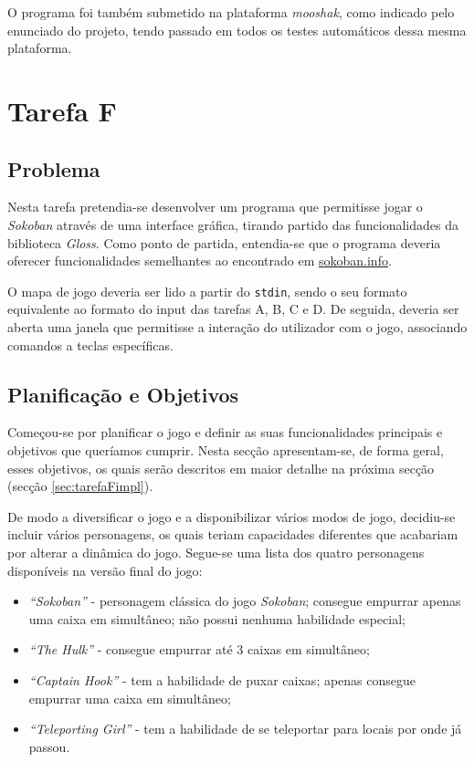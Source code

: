 \documentclass[a4paper]{article}
\begin{document}
O programa foi também submetido na plataforma \textit{mooshak}, como indicado pelo enunciado do projeto, tendo passado em todos os testes automáticos dessa mesma plataforma.

\section{Tarefa F}

\subsection{Problema}

Nesta tarefa pretendia-se desenvolver um programa que permitisse jogar o \textit{Sokoban} através de uma interface gráfica, tirando partido das funcionalidades da biblioteca \textit{Gloss}. Como ponto de partida, entendia-se que o programa deveria oferecer funcionalidades semelhantes ao encontrado em \url{sokoban.info}.

O mapa de jogo deveria ser lido a partir do \texttt{stdin}, sendo o seu formato equivalente ao formato do input das tarefas A, B, C e D. De seguida, deveria ser aberta uma janela que permitisse a interação do utilizador com o jogo, associando comandos a teclas específicas.

\subsection{Planificação e Objetivos}

Começou-se por planificar o jogo e definir as suas funcionalidades principais e objetivos que queríamos cumprir. Nesta secção apresentam-se, de forma geral, esses objetivos, os quais serão descritos em maior detalhe na próxima secção (secção \ref{sec:tarefaFimpl}).

\bigskip

De modo a diversificar o jogo e a disponibilizar vários modos de jogo, decidiu-se incluir vários personagens, os quais teriam capacidades diferentes que acabariam por alterar a dinâmica do jogo. Segue-se uma lista dos quatro personagens disponíveis na versão final do jogo:

\begin{itemize}
	\item \emph{``Sokoban''} - personagem clássica do jogo \textit{Sokoban}; consegue empurrar apenas uma caixa em simultâneo; não possui nenhuma habilidade especial;
	\item \emph{``The Hulk''} - consegue empurrar até 3 caixas em simultâneo;
	\item \emph{``Captain Hook''} - tem a habilidade de puxar caixas; apenas consegue empurrar uma caixa em simultâneo;
	\item \emph{``Teleporting Girl''} - tem a habilidade de se teleportar para locais por onde já passou.
\end{itemize}
\end{document}

